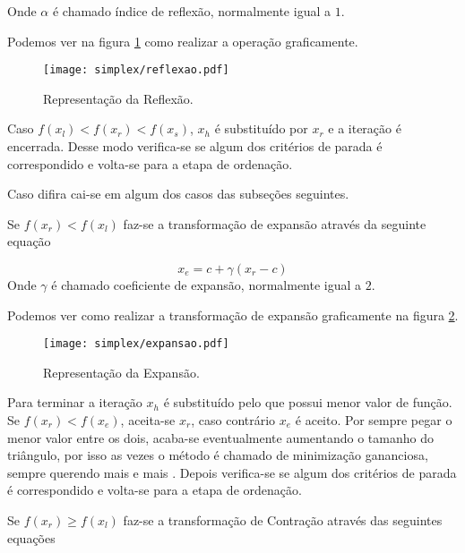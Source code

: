 Onde $\alpha$ é chamado índice de reflexão, normalmente igual a $1$.

Podemos ver na figura \ref{fig:reflexao} como realizar a operação graficamente.


\begin{figure}[H]
	\begin{center}	
		\texttt{[image: simplex/reflexao.pdf]}
		\caption{Representação da Reflexão.}
		\label{fig:reflexao}
	\end{center}
\end{figure}

Caso $f(x_l)<f(x_r)<f(x_s)$, $x_h$ é substituído por $x_r$ e a iteração é encerrada. Desse modo verifica-se se algum dos critérios de parada é correspondido e volta-se para a etapa de ordenação.

Caso difira cai-se em algum dos casos das subseções seguintes.


Se $f(x_r)<f(x_l)$ faz-se a transformação de expansão através da seguinte equação

\begin{equation}
x_e=c+\gamma(x_r-c)
\end{equation}
Onde $\gamma$ é chamado coeficiente de expansão, normalmente igual a $2$.

Podemos ver como realizar a transformação de expansão graficamente na figura \ref{fig:expansao}.



\begin{figure}[H]
	\begin{center}	
		\texttt{[image: simplex/expansao.pdf]}
		\caption{Representação da Expansão.}
		\label{fig:expansao}
	\end{center}
\end{figure}

Para terminar a iteração $x_h$ é substituído pelo que possui menor valor de função. Se $f(x_r)<f(x_e)$, aceita-se $x_r$, caso contrário $x_e$ é aceito. Por sempre pegar o menor valor entre os dois, acaba-se eventualmente aumentando o tamanho do triângulo, por isso as vezes o método é chamado de minimização gananciosa, sempre querendo mais e mais .  Depois verifica-se se algum dos critérios de parada é correspondido e volta-se para a etapa de ordenação.

Se $f(x_r)\geq f(x_l)$ faz-se a transformação de Contração através das seguintes equações





